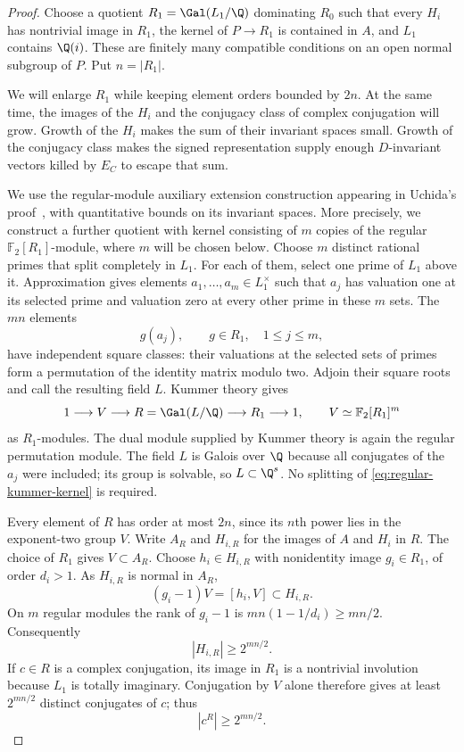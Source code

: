 \begin{proof}
Choose a quotient $R_1=\Gal(L_1/\Q)$ dominating $R_0$ such that
every $H_i$ has nontrivial image in $R_1$, the kernel of $P\to R_1$
is contained in $A$, and $L_1$ contains $\Q(i)$. These are finitely
many compatible conditions on an open normal subgroup of $P$.
Put $n=|R_1|$.

We will enlarge $R_1$ while keeping element orders bounded by $2n$.
At the same time, the images of the $H_i$ and the conjugacy class of
complex conjugation will grow. Growth of the $H_i$ makes the sum
of their invariant spaces small. Growth of the conjugacy class
makes the signed representation supply enough $D$-invariant
vectors killed by $E_C$ to escape that sum.

We use the regular-module auxiliary extension construction appearing
in Uchida's proof~\cite[pp.~360--362]{uchida1979}, with quantitative
bounds on its invariant spaces. More precisely, we construct a
further quotient with kernel consisting of $m$ copies of the regular
$\mathbb F_2[R_1]$-module, where $m$ will be chosen below.
Choose $m$ distinct rational primes that split completely in $L_1$.
For each of them, select one prime of $L_1$ above it. Approximation
gives elements $a_1,\ldots,a_m\in L_1^\times$ such that $a_j$ has
valuation one at its selected prime and valuation zero at every other
prime in these $m$ sets. The $mn$ elements
\[
  g(a_j),\qquad g\in R_1,\quad 1\leq j\leq m,
\]
have independent square classes: their valuations at the selected
sets of primes form a permutation of the identity matrix modulo two.
Adjoin their square roots and call the resulting field $L$.
Kummer theory gives
\begin{equation}\label{eq:regular-kummer-kernel}
  1\longrightarrow V\longrightarrow R=\Gal(L/\Q)
   \longrightarrow R_1\longrightarrow1,
  \qquad V\simeq\mathbb F_2[R_1]^m
\end{equation}
as $R_1$-modules. The dual module supplied by Kummer theory is again
the regular permutation module. The field $L$ is Galois over $\Q$
because all conjugates of the $a_j$ were included; its group is
solvable, so $L\subset\Q^s$. No splitting of
\eqref{eq:regular-kummer-kernel} is required.

Every element of $R$ has order at most $2n$, since its $n$th power
lies in the exponent-two group $V$. Write $A_R$ and $H_{i,R}$ for
the images of $A$ and $H_i$ in $R$. The choice of $R_1$ gives
$V\subset A_R$. Choose $h_i\in H_{i,R}$ with nonidentity image
$g_i\in R_1$, of order $d_i>1$. As $H_{i,R}$ is normal in $A_R$,
\[
 (g_i-1)V=[h_i,V]\subset H_{i,R}.
\]
On $m$ regular modules the rank of $g_i-1$ is
$mn(1-1/d_i)\geq mn/2$. Consequently
\begin{equation}\label{eq:large-subgroups}
  |H_{i,R}|\geq 2^{mn/2}.
\end{equation}
If $c\in R$ is a complex conjugation, its image in $R_1$ is a
nontrivial involution because $L_1$ is totally imaginary.
Conjugation by $V$ alone therefore gives at least $2^{mn/2}$ distinct
conjugates of $c$; thus
\begin{equation}\label{eq:large-conjugacy-class}
  |c^R|\geq 2^{mn/2}.
\end{equation}


\end{proof}
